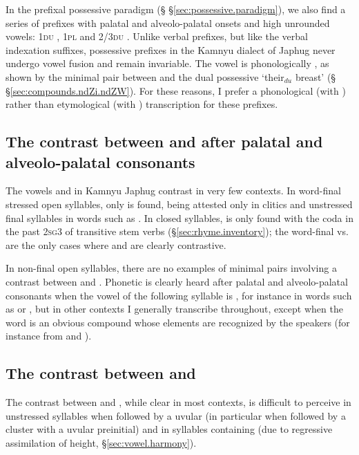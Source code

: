 In the prefixal possessive paradigm (§ §\ref{sec:possessive.paradigm}), we also find a series of prefixes with palatal and alveolo-palatal onsets and high unrounded vowels: \textsc{1du} , \textsc{1pl}  and \textsc{2/3du} . Unlike verbal prefixes, but like the verbal indexation suffixes, possessive prefixes in the Kamnyu dialect of Japhug never undergo vowel fusion and remain invariable. The vowel is phonologically , as shown by the minimal pair between  and the dual possessive  `their$_{du}$ breast' (§ §\ref{sec:compounds.ndZi.ndZW}). For these reasons, I prefer a phonological (with ) rather than etymological (with ) transcription for these prefixes.

\subsection{The contrast between  and  after palatal and alveolo-palatal consonants}
The vowels  and  in Kamnyu Japhug contrast in very few contexts. In word-final stressed open syllables, only  is found,  being attested only in clitics and unstressed final syllables in words such as . In closed syllables,  is only found with the coda  in the past \textsc{2sg}\fl{}3 of transitive  stem verbs (§\ref{sec:rhyme.inventory}); the word-final  vs.  are the only cases where  and  are clearly contrastive.

In non-final open syllables, there are no examples of minimal pairs involving a contrast between  and . Phonetic  is clearly heard after palatal and alveolo-palatal consonants when the vowel of the following syllable is , for instance in words such as  or , but in other contexts I generally transcribe  throughout, except when the word is an obvious compound whose elements are recognized by the speakers (for instance  from  and ). 

\subsection{The contrast between  and } \label{sec:A.vs.a.prefixes}
The contrast between  and , while clear in most contexts, is difficult to perceive in unstressed syllables when followed by a uvular (in particular when followed by a cluster with a uvular preinitial) and in syllables containing  (due to regressive assimilation of height, §\ref{sec:vowel.harmony}).

